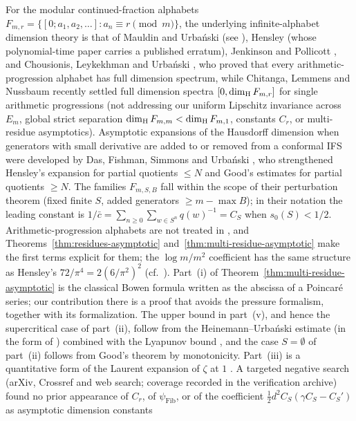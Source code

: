 For the modular continued-fraction alphabets $F_{m,r}=\{[0;a_1,a_2,\dots]:a_n\equiv r\pmod m\}$,
the underlying infinite-alphabet dimension theory is that of Mauldin and
Urba\'nski \cite{MU96} (see \cite[Theorem~2.3]{CLU}), Hensley \cite{Hensley1996}
(whose polynomial-time paper carries a published erratum), Jenkinson and
Pollicott \cite{JP2018}, and Chousionis, Leykekhman and Urba\'nski \cite{CLU},
who proved that every arithmetic-progression alphabet has full dimension
spectrum, while Chitanga, Lemmens and Nussbaum \cite{CLN2026} recently settled
full dimension spectra $[0,\dim_{\mathrm{H}} F_{m,r}]$ for single arithmetic progressions
(not addressing our uniform Lipschitz invariance across $E_m$, global strict
separation $\dim_{\mathrm{H}} F_{m,m}<\dim_{\mathrm{H}} F_{m,1}$, constants $C_r$, or multi-residue
asymptotics). Asymptotic expansions of the Hausdorff dimension when generators
with small derivative are added to or removed from a conformal IFS were
developed by Das, Fishman, Simmons and Urba\'nski \cite{DFSU}, who
strengthened Hensley's expansion \cite{Hensley92} for partial quotients $\le N$
and Good's estimates \cite{Good41} for partial quotients $\ge N$. The families
$F_{m,S,B}$ fall within the scope of their perturbation theorem
\cite[Theorem~4.1]{DFSU} (fixed finite $S$, added generators $\ge m-\max B$);
in their notation the leading constant is $1/\bar c=\sum_{n\ge0}\sum_{w\in S^n}q(w)^{-1}=C_S$
when $s_0(S)<1/2$. Arithmetic-progression alphabets are not treated in
\cite{DFSU}, and Theorems~\ref{thm:residues-asymptotic}
and~\ref{thm:multi-residue-asymptotic} make the first terms explicit for them;
the $\log m/m^2$ coefficient has the same structure as Hensley's
$72/\pi^4=2(6/\pi^2)^2$ (cf.\ \cite[(1.4)]{DFSU}). Part~(i) of
Theorem~\ref{thm:multi-residue-asymptotic} is the classical Bowen formula
written as the abscissa of a Poincar\'e series; our contribution there is a
proof that avoids the pressure formalism, together with its formalization.
The upper bound in part~(v), and hence the supercritical case of part~(ii),
follow from the Heinemann--Urba\'nski estimate \cite{HU02} (in the form of
\cite[Theorem~2.4]{CLU}) combined with the Lyapunov bound
\cite[Proposition~2.6]{CLU}, and the case $S=\emptyset$ of part~(ii) follows
from Good's theorem by monotonicity. Part~(iii) is a quantitative form of the
Laurent expansion of $\zeta$ at $1$ \cite[(25.2.4)]{DLMF}. A targeted negative
search (arXiv, Crossref and web search; coverage recorded in the verification
archive) found no prior appearance of $C_r$, of $\psi_{\mathrm{Fib}}$, or of the
coefficient $\frac12 d^2C_S(\gamma C_S-C_S')$ as asymptotic dimension constants
